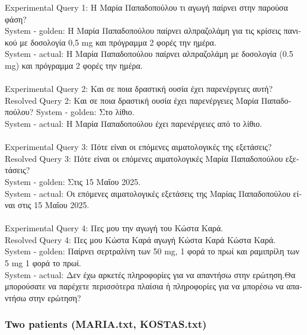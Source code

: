 Experimental Query 1: \textgreek{Η Μαρία Παπαδοπούλου τι αγωγή παίρνει στην παρούσα φάση?} \\
System - golden: \textgreek{Η Μαρία Παπαδοπούλου παίρνει αλπραζολάμη για τις κρίσεις πανικού με δοσολογία 0,5 mg και πρόγραμμα 2 φορές την ημέρα.} \\
System - actual: \textgreek{Η Μαρία Παπαδοπούλου παίρνει αλπραζολάμη με δοσολογία (0.5 m}g) \textgreek{και πρόγραμμα 2 φορές την ημέρα.} \\
\\
Experimental Query 2: \textgreek{Και σε ποια δραστική ουσία έχει παρενέργειες αυτή?} \\
Resolved Query 2: \textgreek{Και σε ποια δραστική ουσία έχει παρενέργειες Μαρία Παπαδοπούλου?}
System - golden: \textgreek{Στο λίθιο.} \\
System - actual: \textgreek{Η Μαρία Παπαδοπούλου έχει παρενέργειες από το λίθιο.}\\
\\
Experimental Query 3: \textgreek{Πότε είναι οι επόμενες αιματολογικές της εξετάσεις?} \\
Resolved Query 3: \textgreek{Πότε είναι οι επόμενες αιματολογικές Μαρία Παπαδοπούλου εξετάσεις?} \\
System - golden: \textgreek{Στις 15 Μαΐου 2025.} \\
System - actual: \textgreek{Οι επόμενες αιματολογικές εξετάσεις της Μαρίας Παπαδοπούλου είναι στις 15 Μαΐου 2025.}\\
\\
Experimental Query 4: \textgreek{Πες μου την αγωγή του Κώστα Καρά.} \\
Resolved Query 4: \textgreek{Πες μου Κώστα Καρά αγωγή Κώστα Καρά Κώστα Καρά.} \\
System - golden: \textgreek{Παίρνει σερτραλίνη των 50} mg, 1 \textgreek{φορά το πρωί και ραμιπρίλη των 5} mg 1 \textgreek{φορά το πρωί.} \\
System - actual: \textgreek{Δεν έχω αρκετές πληροφορίες για να απαντήσω στην ερώτηση.Θα μπορούσατε να παρέχετε περισσότερα πλαίσια ή πληροφορίες για να μπορέσω να απαντήσω στην ερώτηση?}\\

\subsubsection{Two patients (MARIA.txt, KOSTAS.txt)}

